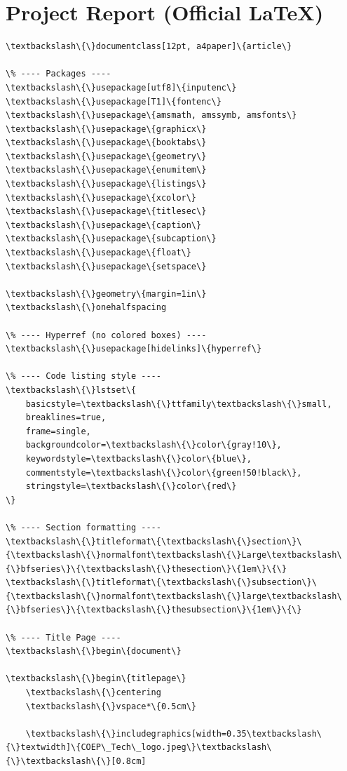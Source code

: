 \documentclass[12pt, a4paper]{article}
\begin{document}
\section{Project Report (Official LaTeX)}
\begin{lstlisting}[style=codestyle, caption={VQA\_Modal\_Analysis\_Report.tex}]
\textbackslash\{\}documentclass[12pt, a4paper]\{article\}

\% ---- Packages ----
\textbackslash\{\}usepackage[utf8]\{inputenc\}
\textbackslash\{\}usepackage[T1]\{fontenc\}
\textbackslash\{\}usepackage\{amsmath, amssymb, amsfonts\}
\textbackslash\{\}usepackage\{graphicx\}
\textbackslash\{\}usepackage\{booktabs\}
\textbackslash\{\}usepackage\{geometry\}
\textbackslash\{\}usepackage\{enumitem\}
\textbackslash\{\}usepackage\{listings\}
\textbackslash\{\}usepackage\{xcolor\}
\textbackslash\{\}usepackage\{titlesec\}
\textbackslash\{\}usepackage\{caption\}
\textbackslash\{\}usepackage\{subcaption\}
\textbackslash\{\}usepackage\{float\}
\textbackslash\{\}usepackage\{setspace\}

\textbackslash\{\}geometry\{margin=1in\}
\textbackslash\{\}onehalfspacing

\% ---- Hyperref (no colored boxes) ----
\textbackslash\{\}usepackage[hidelinks]\{hyperref\}

\% ---- Code listing style ----
\textbackslash\{\}lstset\{
    basicstyle=\textbackslash\{\}ttfamily\textbackslash\{\}small,
    breaklines=true,
    frame=single,
    backgroundcolor=\textbackslash\{\}color\{gray!10\},
    keywordstyle=\textbackslash\{\}color\{blue\},
    commentstyle=\textbackslash\{\}color\{green!50!black\},
    stringstyle=\textbackslash\{\}color\{red\}
\}

\% ---- Section formatting ----
\textbackslash\{\}titleformat\{\textbackslash\{\}section\}\{\textbackslash\{\}normalfont\textbackslash\{\}Large\textbackslash\{\}bfseries\}\{\textbackslash\{\}thesection\}\{1em\}\{\}
\textbackslash\{\}titleformat\{\textbackslash\{\}subsection\}\{\textbackslash\{\}normalfont\textbackslash\{\}large\textbackslash\{\}bfseries\}\{\textbackslash\{\}thesubsection\}\{1em\}\{\}

\% ---- Title Page ----
\textbackslash\{\}begin\{document\}

\textbackslash\{\}begin\{titlepage\}
    \textbackslash\{\}centering
    \textbackslash\{\}vspace*\{0.5cm\}

    \textbackslash\{\}includegraphics[width=0.35\textbackslash\{\}textwidth]\{COEP\_Tech\_logo.jpeg\}\textbackslash\{\}\textbackslash\{\}[0.8cm]


\end{lstlisting}
\end{document}
